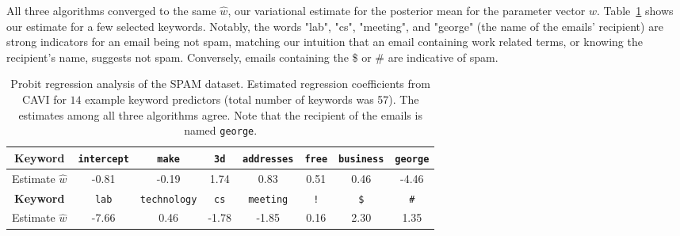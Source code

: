 \documentclass{article}
\begin{document}
All three algorithms converged to the same $\hat w$, our variational estimate for the posterior mean for the parameter vector $w$.  Table~\ref{table:Spam_table} shows our estimate for a few selected keywords. Notably, the words "lab", "cs", "meeting", and "george" (the name of the emails' recipient) are strong indicators for an email being not spam, matching our intuition that an email containing work related terms, or knowing the recipient's name, suggests not spam. Conversely, emails containing the \$ or \# are indicative of spam. 


\begin{table}[tb]
\begin{tabular}{c | c | c | c | c | c | c | c}
\toprule
\toprule
\textbf{Keyword} & \texttt{intercept} & \texttt{make} & \texttt{3d} & \texttt{addresses} & \texttt{free} & \texttt{business} & \texttt{george} \\
\midrule
Estimate $\widehat w$ & -0.81 & -0.19 & 1.74 & 0.83 & 0.51 & 0.46 & -4.46\\
\midrule
\textbf{Keyword} & \texttt{lab} & \texttt{technology} & \texttt{cs} & \texttt{meeting} & \texttt{!} & \texttt{\$} & \texttt{\#} \\
\midrule
Estimate $\widehat w$ & -7.66 & 0.46 & -1.78 & -1.85 & 0.16 & 2.30 & 1.35\\
\bottomrule
\bottomrule
\end{tabular}
\vspace{0.5em}

\caption{Probit regression analysis of the SPAM dataset. Estimated regression coefficients from CAVI for $14$ example keyword predictors (total number of keywords was 57). The estimates among all three algorithms agree. Note that the recipient of the emails is named \texttt{george}.  }
\label{table:Spam_table}
\end{table}
\end{document}
